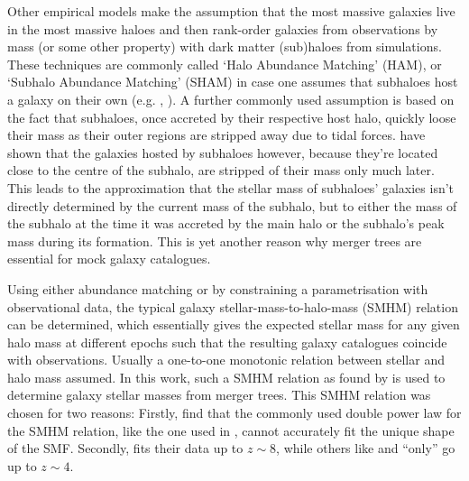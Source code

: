 Other empirical models make the assumption that the most massive galaxies live in the most massive haloes and then rank-order galaxies from observations by mass (or some other property) with dark matter (sub)haloes from simulations.
These techniques are commonly called `Halo Abundance Matching' (HAM), or `Subhalo Abundance Matching' (SHAM) in case one assumes that subhaloes host a galaxy on their own (e.g. \cite{SHAM-Kravtsov}, \cite{SHAM-Vale-Ostriker}).
A further commonly used assumption is based on the fact that subhaloes, once accreted by their respective host halo, quickly loose their mass as their outer regions are stripped away due to tidal forces.
\cite{Nagai} have shown that the galaxies hosted by subhaloes however, because they're located close to the centre of the subhalo, are stripped of their mass only much later.
This leads to the approximation that the stellar mass of subhaloes' galaxies isn't directly determined by the current mass of the subhalo, but to either the mass of the subhalo at the time it was accreted by the main halo or the subhalo's peak mass during its formation.
This is yet another reason why merger trees are essential for mock galaxy catalogues.

Using either abundance matching or by constraining a parametrisation with observational data, the typical galaxy stellar-mass-to-halo-mass (SMHM) relation can be determined, which essentially gives the expected stellar mass for any given halo mass at different epochs such that the resulting galaxy catalogues coincide with observations.
Usually a one-to-one monotonic relation between stellar and halo mass assumed.
In this work, such a SMHM relation as found by \cite{Behroozi} is used to determine galaxy stellar masses from merger trees.
This SMHM relation was chosen for two reasons:
Firstly, \cite{Behroozi} find that the commonly used double power law for the SMHM relation, like the one used in \cite{Moster}, cannot accurately fit the unique shape of the SMF.
Secondly, \cite{Behroozi} fits their data up to $z\sim 8$, while others like \cite{Moster} and \cite{Yang} ``only'' go up to $z\sim 4$.

